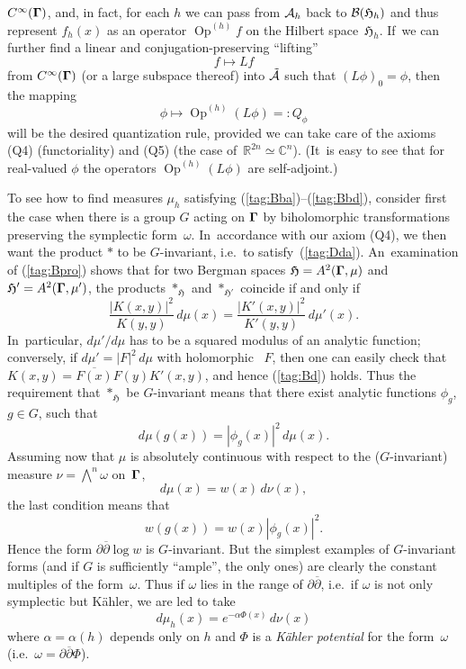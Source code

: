 \documentclass[11pt]{amsart}
\numberwithin{equation}{section}
\theoremstyle{remark}
\newcommand\AAA{{\Cal A}}
\newcommand\h{^{(h)}}
\newcommand\Omg{{\bigam}}   %
\newcommand\Oph{\operatorname{Op}\h}
\newcommand\HH{\mathfrak H}
\newcommand\RR{\mathbb R}
\newcommand{\CC}{\C}
\newcommand{\bigam}{\mbox{\boldmath $\Gamma$}}
\newcommand{\C}{\mathbb C}
\begin{document}
$C^\infty(\Omg)$, and, in fact, for each $h$ we can pass from $\AAA_h$ back
to $\Cal B(\HH_h)$ and thus represent $f_h(x)$ as an operator $\Oph f$ on the
Hilbert space~$\HH_h$. If~we can further find a linear and
conjugation-preserving ``lifting''
\begin{equation}  f\mapsto Lf  \label{tag:Bc}  \end{equation}
from $C^\infty(\Omg)$ (or a large subspace thereof) into $\tilde\AAA$ such
that $(L\phi)_0=\phi$, then the mapping
$$ \phi \mapsto \Oph (L\phi) =: Q_\phi  $$
will be the desired quantization rule, provided we can take care of the axioms
(Q4) (functoriality) and (Q5) (the case of~$\RR^{2n}\simeq\CC^n$). (It~is easy
to see that for real-valued $\phi$ the operators $\Oph(L\phi)$ are
self-adjoint.)

To see how to find measures $\mu_h$ satisfying
(\ref{tag:Bba})--(\ref{tag:Bbd}), consider first the case when there is a group
$G$ acting on $\Omg$ by biholomorphic transformations preserving the
symplectic form~$\omega$. In~accordance with our axiom (Q4), we then want the
product $*$ to be $G$-invariant, i.e.~to satisfy~(\ref{tag:Dda}).
An~examination of (\ref{tag:Bpro}) shows that for two Bergman spaces
$\HH=A^2(\Omg,\mu)$ and $\HH'=A^2(\Omg,\mu')$, the products $*_\HH$ and
$*_{\HH'}$ coincide if and only if
\begin{equation}  \frac{|K(x,y)|^2}{K(y,y)} \,d\mu(x) =
\frac{|K'(x,y)|^2}{K'(y,y)} \,d\mu'(x). \label{tag:Bd}  \end{equation}
In~particular, $d\mu'/d\mu$ has to be a squared modulus of an analytic
function; conversely, if $d\mu'=|F|^2\,d\mu$ with holomorphic ~$F$, then one
can easily check that $K(x,y)=\overline{F(x)}F(y) K'(x,y)$, and hence
(\ref{tag:Bd}) holds. Thus the requirement that $*_\HH$ be $G$-invariant means
that there exist analytic functions $\phi_g$, $g\in G$, such that
$$ d\mu(g(x)) = |\phi_g(x)|^2 \, d\mu(x).  $$
Assuming now that $\mu$ is absolutely continuous with respect to the
($G$-invariant) measure $\nu=\bigwedge^n\omega$ on~$\Omg$,
$$ d\mu(x) = w(x) \,d\nu(x),  $$
the last condition means that
$$ w(g(x)) = w(x) |\phi_g(x)|^2 .  $$
Hence the form $\partial\overline\partial\log w$ is $G$-invariant. But the
simplest examples of $G$-invariant forms (and if $G$ is sufficiently ``ample'',
the only ones) are clearly the constant multiples of the form~$\omega$. Thus if
$\omega$ lies in the range of $\partial\overline\partial$, i.e.~if $\omega$ is
not only symplectic but K\"ahler, we are led to take
\begin{equation}  d\mu_h(x) = e^{-\alpha \Phi(x)} \, d\nu(x)  \label{tag:Be}
\end{equation}
where $\alpha=\alpha(h)$ depends only on $h$ and $\Phi$ is a {\sl K\"ahler
potential\/} for the form~$\omega$
(i.e.~$\omega=\partial\overline\partial\Phi$).
\end{document}
